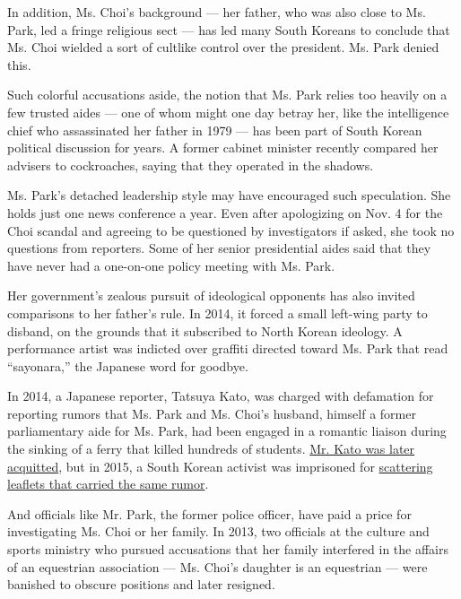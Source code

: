 In addition, Ms. Choi's background --- her father, who was also close to
Ms. Park, led a fringe religious sect --- has led many South Koreans to
conclude that Ms. Choi wielded a sort of cultlike control over the
president. Ms. Park denied this.

Such colorful accusations aside, the notion that Ms. Park relies too
heavily on a few trusted aides --- one of whom might one day betray her,
like the intelligence chief who assassinated her father in 1979 --- has
been part of South Korean political discussion for years. A former
cabinet minister recently compared her advisers to cockroaches, saying
that they operated in the shadows.

Ms. Park's detached leadership style may have encouraged such
speculation. She holds just one news conference a year. Even after
apologizing on Nov. 4 for the Choi scandal and agreeing to be questioned
by investigators if asked, she took no questions from reporters. Some of
her senior presidential aides said that they have never had a one-on-one
policy meeting with Ms. Park.

Her government's zealous pursuit of ideological opponents has also
invited comparisons to her father's rule. In 2014, it forced a small
left-wing party to disband, on the grounds that it subscribed to North
Korean ideology. A performance artist was indicted over graffiti
directed toward Ms. Park that read ``sayonara,'' the Japanese word for
goodbye.

In 2014, a Japanese reporter, Tatsuya Kato, was charged with defamation
for reporting rumors that Ms. Park and Ms. Choi's husband, himself a
former parliamentary aide for Ms. Park, had been engaged in a romantic
liaison during the sinking of a ferry that killed hundreds of students.
\href{http://www.nytimes3xbfgragh.onion/2015/12/18/world/asia/south-korea-park-geun-hye-defamation-verdict.html}{Mr.
Kato was later acquitted}, but in 2015, a South Korean activist was
imprisoned for
\href{http://www.nytimes3xbfgragh.onion/2016/03/06/world/asia/defamation-laws-south-korea-critics-press-freedom.html}{scattering
leaflets that carried the same rumor}.

And officials like Mr. Park, the former police officer, have paid a
price for investigating Ms. Choi or her family. In 2013, two officials
at the culture and sports ministry who pursued accusations that her
family interfered in the affairs of an equestrian association --- Ms.
Choi's daughter is an equestrian --- were banished to obscure positions
and later resigned.

